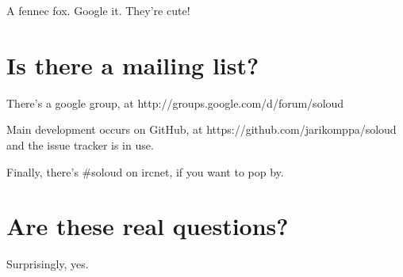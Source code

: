 A fennec fox. Google it. They're cute!

\section{Is there a mailing list?}

There's a google group, at http://groups.google.com/d/forum/soloud

Main development occurs on GitHub, at https://github.com/jarikomppa/soloud and the issue tracker is in use.

Finally, there's \#soloud on ircnet, if you want to pop by.

\section{Are these real questions?}

Surprisingly, yes.